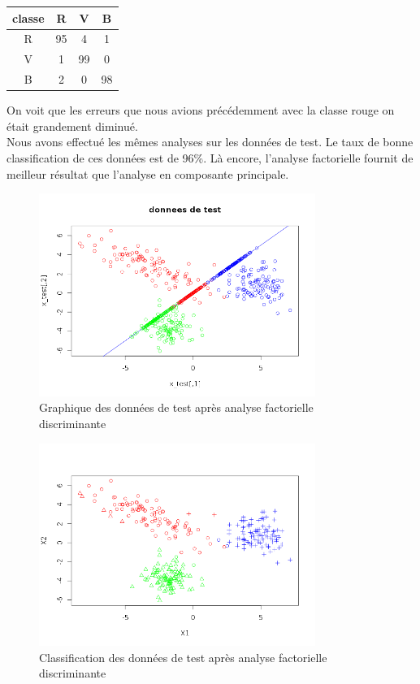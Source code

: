 \documentclass[a4paper,11pt]{article}
\begin{document}
  \begin{center}
  \begin{tabular}{|c|c|c|c|}
   \hline
   classe & R & V & B\\
   \hline
   R & 95 & 4 & 1 \\
   \hline
   V & 1 & 99 & 0 \\
   \hline
   B & 2 & 0 & 98 \\
   \hline
  \end{tabular}
  \end{center}
  
  On voit que les erreurs que nous avions précédemment avec la classe rouge on était grandement
  diminué.\\
  
  Nous avons effectué les mêmes analyses sur les données de test. Le taux de bonne classification de ces 
  données est de 96\%. Là encore, l'analyse factorielle fournit de meilleur résultat que l'analyse en composante
  principale.\\
  
  \begin{figure}[H]
    \center
   \includegraphics[width=9cm]{test_fact.png}
    \caption{Graphique des données de test après analyse factorielle discriminante}
  \end{figure}
  
   \begin{figure}[H]
    \center
   \includegraphics[width=9cm]{test_fact_class.png}
    \caption{Classification des données de test après analyse factorielle discriminante}
  \end{figure}
  
\end{document}
